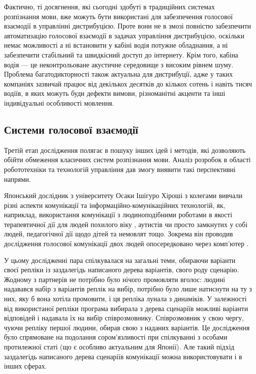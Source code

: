 Фактично, ті досягнення, які сьогодні здобуті в традиційних системах розпізнання мови, вже можуть бути використані для забезпечення голосової взаємодії в управлінні дистрибуцією. Проте вони не в змозі повністю забезпечити автоматизацію голосової взаємодії в задачах управління дистрибуцією, оскільки немає можливості а ні встановити у кабіні водія потужне обладнання, а ні забезпечити стабільний та швидкісний доступ до інтернету. Крім того, кабіна водія — це неконтрольоване акустичне середовище з високим рівнем шуму. Проблема багатодикторності також актуальна для дистрибуції, адже у таких компаніях зазвичай працює від декількох десятків до кількох сотень і навіть тисяч водіїв, в яких можуть буди дефекти вимови, різноманітні акценти та інші індивідуальні особливості мовлення.

\subsection{Системи голосової взаємодії}
Третій етап дослідження полягає в пошуку інших ідей і методів, які дозволяють обійти обмеження класичних систем розпізнання мови. Аналіз розробок в області робототехніки та технологій управління дав змогу виявити такі перспективні напрями.

Японський дослідник з університету Осаки Ішігуро Хіроші з колегами вивчали різні аспекти комунікації та інформаційно-комунікаційних технологій, як, наприклад, використання комунікації з людиноподібними роботами в якості терапевтичної дії для людей похилого віку \cite{Nishio_2015}, аутистів \cite{Kumazaki_2016} чи просто замкнутих у собі людей, педагогічної дії щодо дітей та немовлят \cite{Park_2015} тощо. Зокрема він проводив дослідження голосової комунікації двох людей опосередковано через комп’ютер \cite{Ishiguro_2016}. 

У цьому дослідженні пара спілкувалася на загальні теми, обираючи варіанти своєї репліки із заздалегідь написаного дерева варіантів, свого роду сценарію. Жодному з партнерів не потрібно було нічого промовляти вголос: людині надавався набір з варіантів реплік на вибір, потрібно було лише натиснути на ту з них, яку б вона хотіла  промовити, і ця репліка лунала з динаміків. У залежності від використаної репліки програма вибирала з дерева сценаріїв можливі варіанти відповідей і надавала їх на вибір співрозмовнику. Співрозмовник у свою чергу, чуючи репліку першої людини, обирав свою з наданих варіантів. Це дослідження було спрямоване на подолання сором’язливості при спілкуванні з особами протилежної статі (що є особливо актуальним для Японії). Але такий підхід заздалегідь написаного дерева сценаріїв комунікації можна використовувати і в інших сферах.

